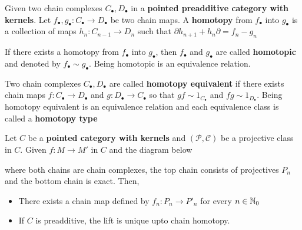 \begin{definition}
	Given two chain complexes $C_\bullet, D_\bullet$ in a \textbf{pointed preadditive category with kernels}. Let $f_\bullet, g_\bullet: C_\bullet \to D_\bullet$ be two chain maps. A \textbf{homotopy} from $f_\bullet$ into $g_\bullet$ is a collection of maps $h_n: C_{n-1} \to D_n$ such that $\partial h_{n+1} + h_n \partial = f_n - g_n$
	
	\begin{center}
	\end{center}
	
	If there exists a homotopy from $f_\bullet$ into $g_\bullet$, then $f_\bullet$ and $g_\bullet$ are called \textbf{homotopic} and denoted by $f_\bullet \sim g_\bullet$. Being homotopic is an equivalence relation.
\end{definition}

\begin{definition}
	Two chain complexes $C_\bullet, D_\bullet$ are called \textbf{homotopy equivalent} if there exists chain maps $f: C_\bullet \to D_\bullet$ and $g: D_\bullet \to C_\bullet$ so that $gf \sim 1_{C_\bullet}$ and $fg \sim 1_{D_\bullet}$. Being homotopy equivalent is an equivalence relation and each equivalence class is called a \textbf{homotopy type}
\end{definition}

\begin{theorem}
	Let $C$ be a \textbf{pointed category with kernels} and $(\mathcal{P}, \mathcal{C})$ be a projective class in $C$. Given $f: M \to M'$ in $C$ and the diagram below
	\begin{center}
	\end{center}
	
	where both chains are chain complexes, the top chain consists of projectives $P_n$ and the bottom chain is exact. Then,
	\begin{itemize}
		\item There exists a chain map defined by $f_n: P_n \to P'_n$ for every $n \in \mathbb{N}_0$
		\item If $C$ is preadditive, the lift is unique upto chain homotopy.
	\end{itemize}
\end{theorem}

